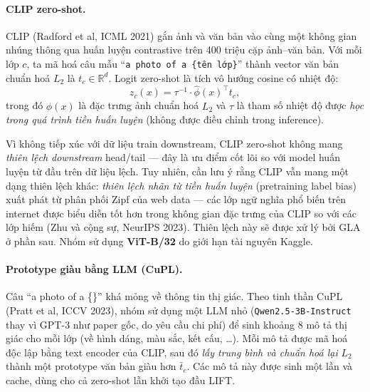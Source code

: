 \paragraph{CLIP zero-shot.}
CLIP \cite{radford2021clip} (Radford et al, ICML 2021) gắn ảnh và văn bản vào cùng một không gian nhúng thông qua
huấn luyện contrastive trên 400 triệu cặp ảnh--văn bản. Với mỗi lớp $c$, ta mã hoá câu mẫu
``\texttt{a photo of a \{tên lớp\}}'' thành vector văn bản chuẩn hoá $L_2$ là $t_c \in \mathbb{R}^d$.
Logit zero-shot là tích vô hướng cosine có nhiệt độ:
\[
  z_c(x) = \tau^{-1} \cdot \hat\phi(x)^\top t_c,
\]
trong đó $\hat\phi(x)$ là đặc trưng ảnh chuẩn hoá $L_2$ và $\tau$ là tham số nhiệt độ được \emph{học
trong quá trình tiền huấn luyện} (không được điều chỉnh trong inference).
 
Vì không tiếp xúc với dữ liệu train downstream, CLIP zero-shot không mang \emph{thiên lệch
downstream} head/tail --- đây là ưu điểm cốt lõi so với model huấn luyện từ đầu trên dữ liệu lệch.
Tuy nhiên, cần lưu ý rằng CLIP vẫn mang một dạng thiên lệch khác: \emph{thiên lệch nhãn từ tiền
huấn luyện} (pretraining label bias) xuất phát từ phân phối Zipf của web data --- các lớp ngữ nghĩa
phổ biến trên internet được biểu diễn tốt hơn trong không gian đặc trưng của CLIP so với các lớp
hiếm (Zhu và cộng sự, NeurIPS 2023). Thiên lệch này sẽ được xử lý bởi GLA ở phần sau. Nhóm sử dụng
\textbf{ViT-B/32} do giới hạn tài nguyên Kaggle.

\paragraph{Prototype giàu bằng LLM (CuPL).}
Câu ``a photo of a \{\}'' khá mỏng về thông tin thị giác. Theo tinh thần CuPL \cite{pratt2023cupl} (Pratt et al,
ICCV 2023), nhóm sử dụng một LLM nhỏ (\texttt{Qwen2.5-3B-Instruct} thay vì GPT-3 như paper gốc, do
yêu cầu chi phí) để sinh khoảng 8 mô tả thị giác cho mỗi lớp (về hình dáng, màu sắc, kết cấu,
\ldots). Mỗi mô tả được mã hoá độc lập bằng text encoder của CLIP, sau đó \emph{lấy trung bình và
chuẩn hoá lại} $L_2$ thành một prototype văn bản giàu hơn $\bar{t}_c$. Các mô tả này được sinh một
lần và cache, dùng cho cả zero-shot lẫn khởi tạo đầu LIFT.
 
